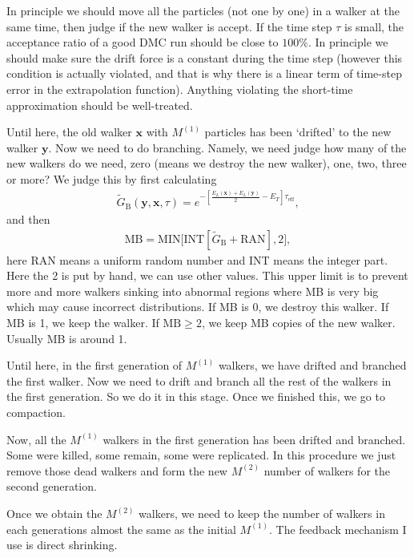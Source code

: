 \documentclass[12pt,letterpaper,UTF8]{report}
\begin{document}
{\begin{description}
      In principle we should move all the particles (not one by one) in a walker at the same time, then judge if the new walker is accept. If the time step $\tau$ is small, the acceptance ratio of a good DMC run should be close to $100\%$. In principle we should make sure the drift force is a constant during the time step (however this condition is actually violated, and that is why there is a linear term of time-step error in the extrapolation function). Anything violating the short-time approximation should be well-treated.
  \item[Branching] Until here, the old walker $\bm{x}$ with $M^{(1)}$ particles has been `drifted' to the new walker $\bm{y}$. Now we need to do branching. Namely, we need judge how many of the new walkers do we need, zero (means we destroy the new walker), one, two, three or more? We judge this by first calculating
\begin{eqnarray}
\tilde{G}_{\textrm{B}}(\bm{y},\bm{x},\tau) = e^{ - [  \frac{ E_L(\bm{x}) + E_L(\bm{y})  }{2} - E_T ] \tau_{\textrm{eff}}  },
 \end{eqnarray}
and then
 \begin{eqnarray}
 \textrm{MB} = \textrm{MIN}\big[\textrm{INT}[ \tilde{G}_{\textrm{B}} + \textrm{RAN}], 2\big],
 \end{eqnarray}
here $\textrm{RAN}$ means a uniform random number and INT means the integer part. Here the 2 is put by hand, we can use other values. This upper limit is to prevent more and more walkers sinking into abnormal regions where MB is very big which may cause incorrect distributions.
If MB is 0, we destroy this walker.
If MB is 1, we keep the walker.
If $\textrm{MB} \geq 2$, we keep MB copies of the new walker. Usually MB is around 1.

  \item[Ergodicity] Until here, in the first generation of $M^{(1)}$ walkers, we have drifted and branched the first walker. Now we need to drift and branch all the rest of the walkers in the first generation. So we do it in this stage. Once we finished this, we go to compaction.
  \item[Compaction] Now, all the $M^{(1)}$ walkers in the first generation has been drifted and branched. Some were killed, some remain, some were replicated. In this procedure we just remove those dead walkers and form the new $M^{(2)}$ number of walkers for the second generation.
  \item[Population control] Once we obtain the $M^{(2)}$ walkers, we need to keep the number of walkers in each generations almost the same as the initial $M^{(1)}$. The feedback mechanism I use is direct shrinking.


\end{description}}
\end{document}

